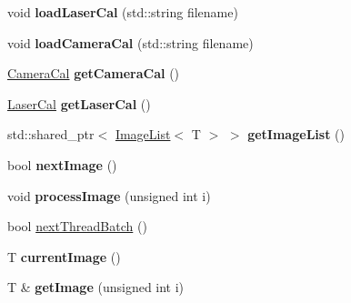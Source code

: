 \begin{DoxyCompactItemize}
\item 
void {\bfseries load\+Laser\+Cal} (std\+::string filename)\hypertarget{classLaserWaterfall_ab151837565a5fdd04c85b460cd38a3a4}{}\label{classLaserWaterfall_ab151837565a5fdd04c85b460cd38a3a4}

\item 
void {\bfseries load\+Camera\+Cal} (std\+::string filename)\hypertarget{classLaserWaterfall_af4d12184d7c827a6dc7b632742be6b36}{}\label{classLaserWaterfall_af4d12184d7c827a6dc7b632742be6b36}

\item 
\hyperlink{classCameraCal}{Camera\+Cal} {\bfseries get\+Camera\+Cal} ()\hypertarget{classLaserWaterfall_aeefda605acb879bd3081ecb73942e171}{}\label{classLaserWaterfall_aeefda605acb879bd3081ecb73942e171}

\item 
\hyperlink{classLaserCal}{Laser\+Cal} {\bfseries get\+Laser\+Cal} ()\hypertarget{classLaserWaterfall_a0208156ed7159acb5f1532b0cab7daab}{}\label{classLaserWaterfall_a0208156ed7159acb5f1532b0cab7daab}

\item 
std\+::shared\+\_\+ptr$<$ \hyperlink{classImageList}{Image\+List}$<$ T $>$ $>$ {\bfseries get\+Image\+List} ()\hypertarget{classLaserWaterfall_a3eec9a9b1d8db536696251ce937c01f0}{}\label{classLaserWaterfall_a3eec9a9b1d8db536696251ce937c01f0}

\item 
bool {\bfseries next\+Image} ()\hypertarget{classLaserWaterfall_ac11ac0811c2d8ac1c31d8fc575892756}{}\label{classLaserWaterfall_ac11ac0811c2d8ac1c31d8fc575892756}

\item 
void {\bfseries process\+Image} (unsigned int i)\hypertarget{classLaserWaterfall_a58920dba080341d697a825977603f597}{}\label{classLaserWaterfall_a58920dba080341d697a825977603f597}

\item 
bool \hyperlink{classLaserWaterfall_a5a51ba6a7277355d1f30d5d9ba321619}{next\+Thread\+Batch} ()
\item 
T {\bfseries current\+Image} ()\hypertarget{classLaserWaterfall_af4888167b7f3b1506f8d94a4f7b3bd19}{}\label{classLaserWaterfall_af4888167b7f3b1506f8d94a4f7b3bd19}

\item 
T \& {\bfseries get\+Image} (unsigned int i)\hypertarget{classLaserWaterfall_ab715d101c696649254e9fc0e5d35a9f0}{}\label{classLaserWaterfall_ab715d101c696649254e9fc0e5d35a9f0}


\end{DoxyCompactItemize}
